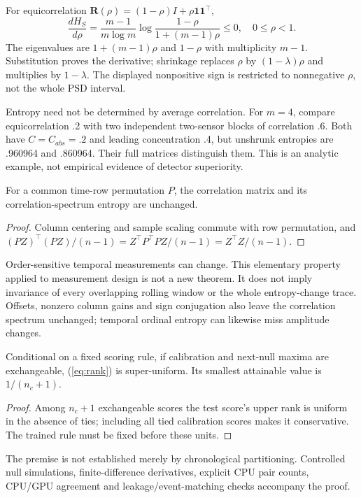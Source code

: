 \documentclass{llncs}
\newcommand{\R}{\mathbf R}
\begin{document}
For equicorrelation $\R(\rho)=(1-\rho)I+\rho\mathbf1\mathbf1^\top$,
\begin{equation}
\frac{dH_S}{d\rho}=\frac{m-1}{m\log m}
\log\frac{1-\rho}{1+(m-1)\rho}\leq0,\quad 0\leq\rho<1.
\end{equation}
The eigenvalues are $1+(m-1)\rho$ and $1-\rho$ with multiplicity $m-1$.
Substitution proves the derivative; shrinkage replaces $\rho$ by
$(1-\lambda)\rho$ and multiplies by $1-\lambda$. The displayed nonpositive
sign is restricted to nonnegative $\rho$, not the whole PSD interval.

Entropy need not be determined by average correlation. For $m=4$, compare
equicorrelation .2 with two independent two-sensor blocks of correlation .6.
Both have $C=C_{abs}=.2$ and leading concentration .4, but unshrunk entropies
are .960964 and .860964. Their full matrices distinguish them. This is an
analytic example, not empirical evidence of detector superiority.

\begin{proposition}
For a common time-row permutation $P$, the correlation matrix and its
correlation-spectrum entropy are unchanged.
\end{proposition}
\begin{proof}
Column centering and sample scaling commute with row permutation, and
$(PZ)^\top(PZ)/(n-1)=Z^\top P^\top PZ/(n-1)=Z^\top Z/(n-1)$.
\end{proof}
Order-sensitive temporal measurements can change. This elementary property
applied to measurement design is not a new theorem. It does not imply invariance
of every overlapping rolling window or the whole entropy-change trace. Offsets,
nonzero column gains and sign conjugation also leave the correlation spectrum
unchanged; temporal ordinal entropy can likewise miss amplitude changes.

\begin{proposition}
Conditional on a fixed scoring rule, if calibration and next-null maxima are
exchangeable, (\ref{eq:rank}) is super-uniform. Its smallest attainable value
is $1/(n_c+1)$.
\end{proposition}
\begin{proof}
Among $n_c+1$ exchangeable scores the test score's upper rank is uniform in
the absence of ties; including all tied calibration scores makes it
conservative. The trained rule must be fixed before these units.\end{proof}
The premise is not established merely by chronological partitioning. Controlled
null simulations, finite-difference derivatives, explicit CPU pair counts,
CPU/GPU agreement and leakage/event-matching checks accompany the proof.
\end{document}
